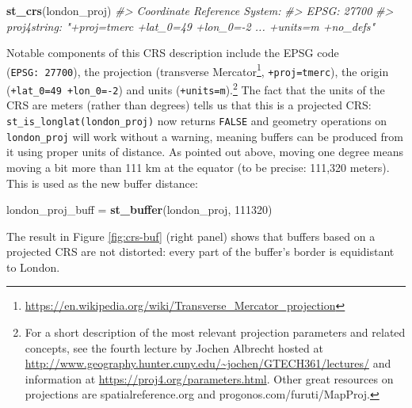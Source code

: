 \documentclass[]{krantz}
\newenvironment{Shaded}{\begin{snugshade}}{\end{snugshade}}
\newcommand{\CommentTok}[1]{\textcolor[rgb]{0.37,0.37,0.37}{\textit{#1}}}
\newcommand{\DecValTok}[1]{\textcolor[rgb]{0.06,0.06,0.06}{#1}}
\newcommand{\KeywordTok}[1]{\textcolor[rgb]{0.27,0.27,0.27}{\textbf{#1}}}
\newcommand{\NormalTok}[1]{#1}
\newcommand{\StringTok}[1]{\textcolor[rgb]{0.5,0.5,0.5}{#1}}
\let\rmarkdownfootnote\footnote%
\def\footnote{\protect\rmarkdownfootnote}
\renewcommand{\href}[2]{#2\footnote{\url{#1}}}
\begin{document}
\begin{Shaded}
\begin{Highlighting}[]
\KeywordTok{st_crs}\NormalTok{(london_proj)}
\CommentTok{#> Coordinate Reference System:}
\CommentTok{#>   EPSG: 27700 }
\CommentTok{#>   proj4string: "+proj=tmerc +lat_0=49 +lon_0=-2 ... +units=m +no_defs"}
\end{Highlighting}
\end{Shaded}

Notable components of this CRS description include the EPSG code (\texttt{EPSG:\ 27700}), the projection (\href{https://en.wikipedia.org/wiki/Transverse_Mercator_projection}{transverse Mercator}, \texttt{+proj=tmerc}), the origin (\texttt{+lat\_0=49\ +lon\_0=-2}) and units (\texttt{+units=m}).\footnote{For a short description of the most relevant projection parameters and related concepts, see the fourth lecture by Jochen Albrecht hosted at
  \url{http://www.geography.hunter.cuny.edu/~jochen/GTECH361/lectures/} and information at \url{https://proj4.org/parameters.html}.
  Other great resources on projections are spatialreference.org and progonos.com/furuti/MapProj.}
The fact that the units of the CRS are meters (rather than degrees) tells us that this is a projected CRS: \texttt{st\_is\_longlat(london\_proj)} now returns \texttt{FALSE} and geometry operations on \texttt{london\_proj} will work without a warning, meaning buffers can be produced from it using proper units of distance.
As pointed out above, moving one degree means moving a bit more than 111 km at the equator (to be precise: 111,320 meters).
This is used as the new buffer distance:

\begin{Shaded}
\begin{Highlighting}[]
\NormalTok{london_proj_buff =}\StringTok{ }\KeywordTok{st_buffer}\NormalTok{(london_proj, }\DecValTok{111320}\NormalTok{)}
\end{Highlighting}
\end{Shaded}

The result in Figure \ref{fig:crs-buf} (right panel) shows that buffers based on a projected CRS are not distorted:
every part of the buffer's border is equidistant to London.
\end{document}
